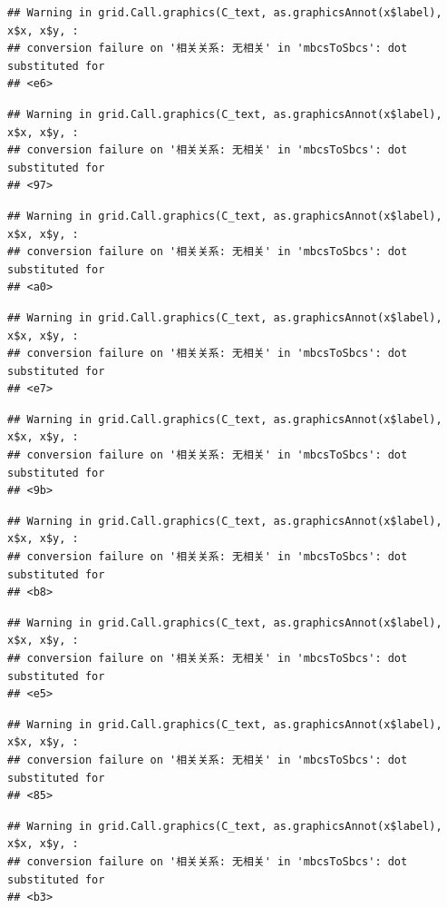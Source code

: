 \documentclass[
]{book}
\begin{document}
\begin{verbatim}
## Warning in grid.Call.graphics(C_text, as.graphicsAnnot(x$label), x$x, x$y, :
## conversion failure on '相关关系: 无相关' in 'mbcsToSbcs': dot substituted for
## <e6>
\end{verbatim}

\begin{verbatim}
## Warning in grid.Call.graphics(C_text, as.graphicsAnnot(x$label), x$x, x$y, :
## conversion failure on '相关关系: 无相关' in 'mbcsToSbcs': dot substituted for
## <97>
\end{verbatim}

\begin{verbatim}
## Warning in grid.Call.graphics(C_text, as.graphicsAnnot(x$label), x$x, x$y, :
## conversion failure on '相关关系: 无相关' in 'mbcsToSbcs': dot substituted for
## <a0>
\end{verbatim}

\begin{verbatim}
## Warning in grid.Call.graphics(C_text, as.graphicsAnnot(x$label), x$x, x$y, :
## conversion failure on '相关关系: 无相关' in 'mbcsToSbcs': dot substituted for
## <e7>
\end{verbatim}

\begin{verbatim}
## Warning in grid.Call.graphics(C_text, as.graphicsAnnot(x$label), x$x, x$y, :
## conversion failure on '相关关系: 无相关' in 'mbcsToSbcs': dot substituted for
## <9b>
\end{verbatim}

\begin{verbatim}
## Warning in grid.Call.graphics(C_text, as.graphicsAnnot(x$label), x$x, x$y, :
## conversion failure on '相关关系: 无相关' in 'mbcsToSbcs': dot substituted for
## <b8>
\end{verbatim}

\begin{verbatim}
## Warning in grid.Call.graphics(C_text, as.graphicsAnnot(x$label), x$x, x$y, :
## conversion failure on '相关关系: 无相关' in 'mbcsToSbcs': dot substituted for
## <e5>
\end{verbatim}

\begin{verbatim}
## Warning in grid.Call.graphics(C_text, as.graphicsAnnot(x$label), x$x, x$y, :
## conversion failure on '相关关系: 无相关' in 'mbcsToSbcs': dot substituted for
## <85>
\end{verbatim}

\begin{verbatim}
## Warning in grid.Call.graphics(C_text, as.graphicsAnnot(x$label), x$x, x$y, :
## conversion failure on '相关关系: 无相关' in 'mbcsToSbcs': dot substituted for
## <b3>
\end{verbatim}
\end{document}
